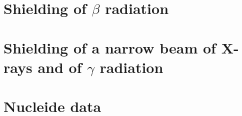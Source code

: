 \section{Shielding of $\beta$ radiation}
\section{Shielding of a narrow beam of X-rays and of $\gamma$ radiation}
\section{Nucleide data}